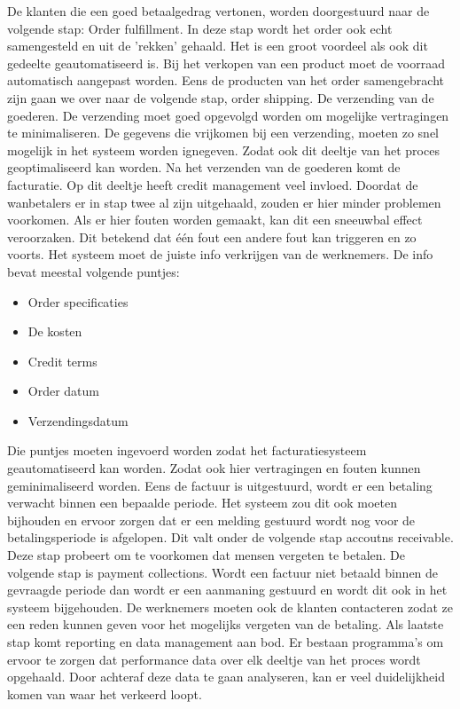 De klanten die een goed betaalgedrag vertonen, worden doorgestuurd naar de volgende stap: Order fulfillment. In deze stap wordt het order ook echt samengesteld en uit de 'rekken' gehaald. Het is een groot voordeel als ook dit gedeelte geautomatiseerd is. Bij het verkopen van een product moet de voorraad automatisch aangepast worden. Eens de producten van het order samengebracht zijn gaan we over naar de volgende stap, order shipping. De verzending van de goederen. De verzending moet goed opgevolgd worden om mogelijke vertragingen te minimaliseren. De gegevens die vrijkomen bij een verzending, moeten zo snel mogelijk in het systeem worden ignegeven. Zodat ook dit deeltje van het proces geoptimaliseerd kan worden. 
Na het verzenden van de goederen komt de facturatie. Op dit deeltje heeft credit management veel invloed. Doordat de wanbetalers er in stap twee al zijn uitgehaald, zouden er hier minder problemen voorkomen. Als er hier fouten worden gemaakt, kan dit een sneeuwbal effect veroorzaken. Dit betekend dat één fout een andere fout kan triggeren en zo voorts. Het systeem moet de juiste info verkrijgen van de werknemers. De info bevat meestal volgende puntjes:
\begin{itemize}
	\item Order specificaties
	\item De kosten
	\item Credit terms
	\item Order datum
	\item Verzendingsdatum
\end{itemize}
Die puntjes moeten ingevoerd worden zodat het facturatiesysteem geautomatiseerd kan worden. Zodat ook hier vertragingen en fouten kunnen geminimaliseerd worden. Eens de factuur is uitgestuurd, wordt er een betaling verwacht binnen een bepaalde periode. Het systeem zou dit ook moeten bijhouden en ervoor zorgen dat er een melding gestuurd wordt nog voor de betalingsperiode is afgelopen. Dit valt onder de volgende stap accoutns receivable. Deze stap probeert om te voorkomen dat mensen vergeten te betalen. 
De volgende stap is payment collections. Wordt een factuur niet betaald binnen de gevraagde periode dan wordt er een aanmaning gestuurd en wordt dit ook in het systeem bijgehouden. De werknemers moeten ook de klanten contacteren zodat ze een reden kunnen geven voor het mogelijks vergeten van de betaling. 
Als laatste stap komt reporting en data management aan bod. Er bestaan programma's om ervoor te zorgen dat performance data over elk deeltje van het proces wordt opgehaald. Door achteraf deze data te gaan analyseren, kan er veel duidelijkheid komen van waar het verkeerd loopt. 

